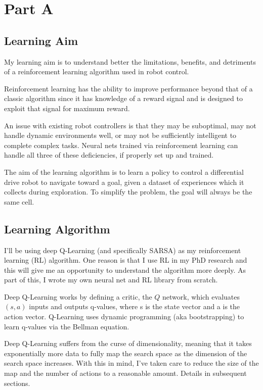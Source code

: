 \documentclass[11pt]{article}
\begin{document}
 
\singlespacing

\section{Part A}
\subsection{Learning Aim}

My learning aim is to understand better the limitations, benefits, and detriments of a reinforcement learning algorithm used in robot control.

Reinforcement learning has the ability to improve performance beyond that of a classic algorithm since it has knowledge of a reward signal and is designed to exploit that signal for maximum reward.

An issue with existing robot controllers is that they may be suboptimal, may not handle dynamic environments well, or may not be sufficiently intelligent to complete complex tasks. Neural nets trained via reinforcement learning can handle all three of these deficiencies, if properly set up and trained.

The aim of the learning algorithm is to learn a policy to control a differential drive robot to navigate toward a goal, given a dataset of experiences which it collects during exploration. To simplify the problem, the goal will always be the same cell.

\subsection{Learning Algorithm}
I'll be using deep Q-Learning (and specifically SARSA) as my reinforcement learning (RL) algorithm.  One reason is that I use RL in my PhD research and this will give me an opportunity to understand the algorithm more deeply. As part of this, I wrote my own neural net and RL library from scratch.

Deep Q-Learning works by defining a critic, the $Q$ network, which evaluates $(s, a)$ inputs and outputs q-values, where s is the state vector and a is the action vector. Q-Learning uses dynamic programming (aka bootstrapping) to learn q-values via the Bellman equation.

Deep Q-Learning suffers from the curse of dimensionality, meaning that it takes exponentially more data to fully map the search space as the dimension of the search space increases. With this in mind, I've taken care to reduce the size of the map and the number of actions to a reasonable amount. Details in subsequent sections.
\end{document}
